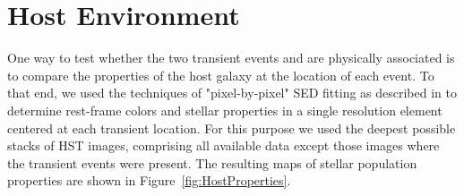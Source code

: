 \section{Host Environment}
\label{sec:Host}
One way to test whether the two transient events \spockone and \spocktwo are physically associated is to compare the properties of the \spock host galaxy at the location of each event.   To that end, we used the techniques of "pixel-by-pixel" SED fitting as described in \citet{Hemmati:2014} to determine rest-frame colors and stellar properties in a single resolution element centered at each transient location.  For this purpose we used the deepest possible stacks of HST images, comprising all available data except those images where the transient events were present.  The resulting maps of stellar population properties are shown in Figure~\ref{fig:HostProperties}. 